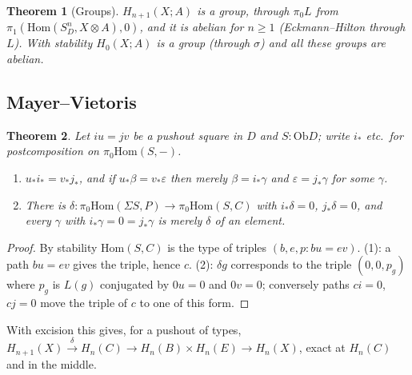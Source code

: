 \documentclass[11pt]{amsart}
\numberwithin{equation}{section}
\newtheorem{theorem}{Theorem}[section]
\theoremstyle{definition}
\theoremstyle{remark}
\newcommand{\Ob}{\mathrm{Ob}}
\newcommand{\Hom}{\mathrm{Hom}}
\begin{document}
\begin{theorem}[Groups]
$H_{n+1}(X;A)$ is a group, through $\pi_0 L$ from $\pi_1(\Hom(S^n_D,X\otimes A),0)$,
and it is abelian for $n\ge1$ (Eckmann--Hilton through $L$). With stability
$H_0(X;A)$ is a group (through $\sigma$) and all these groups are abelian.
\end{theorem}

\subsection*{Mayer--Vietoris}
\begin{theorem}
Let $iu=jv$ be a pushout square in $D$ and $S:\Ob D$; write $i_*$ etc.\ for
postcomposition on $\pi_0\Hom(S,-)$.
\begin{enumerate}
\item $u_*i_*=v_*j_*$, and if $u_*\beta=v_*\varepsilon$ then merely
  $\beta=i_*\gamma$ and $\varepsilon=j_*\gamma$ for some $\gamma$.
\item There is $\delta:\pi_0\Hom(\Sigma S,P)\to\pi_0\Hom(S,C)$ with
  $i_*\delta=0$, $j_*\delta=0$, and every $\gamma$ with $i_*\gamma=0=j_*\gamma$ is
  merely $\delta$ of an element.
\end{enumerate}
\end{theorem}
\begin{proof}
By stability $\Hom(S,C)$ is the type of triples $(b,e,p:bu=ev)$. (1): a path
$bu=ev$ gives the triple, hence $c$. (2): $\delta g$ corresponds to the triple
$(0,0,p_g)$ where $p_g$ is $L(g)$ conjugated by $0u=0$ and $0v=0$; conversely
paths $ci=0$, $cj=0$ move the triple of $c$ to one of this form.
\end{proof}
With excision this gives, for a pushout of types,
$H_{n+1}(X)\xrightarrow{\delta}H_n(C)\to H_n(B)\times H_n(E)\to H_n(X)$, exact at
$H_n(C)$ and in the middle.
\end{document}
